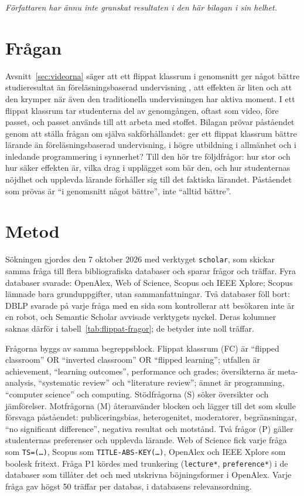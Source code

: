 \emph{Författaren har ännu inte granskat resultaten i den här bilagan i sin
helhet.}

\section{Frågan}

Avsnitt~\ref{sec:videorna} säger att ett flippat klassrum i genomsnitt ger
något bättre studieresultat än föreläsningsbaserad undervisning
\parencite{LagSaele2019,vanAlten2019}, att effekten är liten och att den
krymper när även den traditionella undervisningen har aktiva moment. I ett
flippat klassrum tar studenterna del av genomgången, oftast som video, före
passet, och passet används till att arbeta med stoffet. Bilagan prövar
påståendet genom att ställa frågan om själva sakförhållandet: ger ett
flippat klassrum bättre lärande än föreläsningsbaserad undervisning, i
högre utbildning i allmänhet och i inledande programmering i synnerhet?
Till den hör tre följdfrågor: hur stor och hur säker effekten är, vilka
drag i upplägget som bär den, och hur studenternas nöjdhet och upplevda
lärande förhåller sig till det faktiska lärandet. Påståendet som prövas är
\enquote{i genomsnitt något bättre}, inte \enquote{alltid bättre}.

\section{Metod}

Sökningen gjordes den 7 oktober 2026 med verktyget \texttt{scholar}, som
skickar samma fråga till flera bibliografiska databaser och sparar frågor
och träffar. Fyra databaser svarade: OpenAlex, Web of Science, Scopus och
IEEE Xplore; Scopus lämnade bara grunduppgifter, utan sammanfattningar.
Två databaser föll bort: DBLP svarade på varje fråga med en sida som
kontrollerar att besökaren inte är en robot, och Semantic Scholar avvisade
verktygets nyckel. Deras kolumner saknas därför i
tabell~\ref{tab:flippat-fragor}; de betyder inte noll träffar.

Frågorna byggs av samma begreppsblock. Flippat klassrum (FC) är
\enquote{flipped classroom} OR \enquote{inverted classroom} OR
\enquote{flipped learning}; utfallen är achievement, \enquote{learning
outcomes}, performance och grades; översikterna är meta-analysis,
\enquote{systematic review} och \enquote{literature review}; ämnet är
programming, \enquote{computer science} och computing. Stödfrågorna (S)
söker översikter och jämförelser. Motfrågorna (M) återanvänder blocken och
lägger till det som skulle försvaga påståendet: publiceringsbias,
heterogenitet, moderatorer, begränsningar, \enquote{no significant
difference}, negativa resultat och motstånd. Två frågor (P) gäller
studenternas preferenser och upplevda lärande. Web of Science fick varje
fråga som \texttt{TS=(\dots)}, Scopus som \texttt{TITLE-ABS-KEY(\dots)},
OpenAlex och IEEE Xplore som boolesk fritext. Fråga P1 kördes med
trunkering (\texttt{lecture*}, \texttt{preference*}) i de databaser som
tillåter det och med utskrivna böjningsformer i OpenAlex. Varje fråga gav
högst 50 träffar per databas, i databasens relevansordning.

